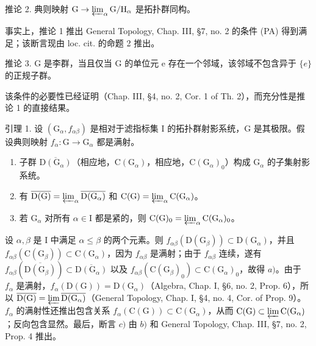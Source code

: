 推论 2. 典则映射 \(\mathrm{G} \to \varprojlim_{\alpha} \mathrm{G} / \mathrm{H}_{\alpha}\) 是拓扑群同构。

事实上，推论 1 推出 General Topology, Chap. III, §7, no. 2 的条件 (PA) 得到满足；该断言现由 loc. cit. 的命题 2 推出。

推论 3. G 是李群，当且仅当 G 的单位元 e 存在一个邻域，该邻域不包含异于 \(\{e\}\) 的正规子群。

该条件的必要性已经证明（Chap. III, §4, no. 2, Cor. 1 of Th. 2），而充分性是推论 1 的直接结果。


引理 1. 设 \((\mathrm{G}_{\alpha}, f_{\alpha \beta})\) 是相对于滤指标集 I 的拓扑群射影系统，G 是其极限。假设典则映射 \(f_{\alpha}: \mathrm{G} \to \mathrm{G}_{\alpha}\) 都是满射。

\begin{enumerate}
\def\labelenumi{\alph{enumi})}
\item
  子群 \(\overline{\mathrm{D}(\mathrm{G}_{\alpha})}\)（相应地，\(\mathrm{C}(\mathrm{G}_{\alpha})\)，相应地，\(\mathrm{C}(\mathrm{G}_{\alpha})_0\)）构成 \(\mathrm{G}_{\alpha}\) 的子集射影系统。
\item
  有 \(\overline{\mathrm{D}(\mathrm{G})}=\varprojlim_{\alpha}\overline{\mathrm{D}(\mathrm{G}_{\alpha})}\) 和 \(\mathrm{C}(\mathrm{G})=\varprojlim_{\alpha}\mathrm{C}(\mathrm{G}_{\alpha})\)。
\item
  若 \(\mathrm{G}_{\alpha}\) 对所有 \(\alpha \in \mathrm{I}\) 都是紧的，则 \(\mathrm{C}(\mathrm{G})_0 = \varprojlim_{\alpha} \mathrm{C}(\mathrm{G}_{\alpha})_0\)。
\end{enumerate}

设 \(\alpha, \beta\) 是 I 中满足 \(\alpha \leq \beta\) 的两个元素。则 \(f_{\alpha \beta}(\mathrm{D}(\mathrm{G}_{\beta})) \subset \mathrm{D}(\mathrm{G}_{\alpha})\)，并且 \(f_{\alpha \beta}(\mathrm{C}(\mathrm{G}_{\beta})) \subset \mathrm{C}(\mathrm{G}_{\alpha})\)，因为 \(f_{\alpha \beta}\) 是满射；由于 \(f_{\alpha \beta}\) 连续，遂有 \(f_{\alpha \beta}(\overline{\mathrm{D}(\mathrm{G}_{\beta})}) \subset \overline{\mathrm{D}(\mathrm{G}_{\alpha})}\) 以及 \(f_{\alpha \beta}(\mathrm{C}(\mathrm{G}_{\beta})_0) \subset \mathrm{C}(\mathrm{G}_{\alpha})_0\)，故得 \(a)\)。由于 \(f_{\alpha}\) 是满射，\(f_{\alpha}(\mathrm{D}(\mathrm{G})) = \mathrm{D}(\mathrm{G}_{\alpha})\)（Algebra, Chap. I, §6, no. 2, Prop. 6），所以 \(\overline{\mathrm{D}(\mathrm{G})} = \varprojlim \overline{\mathrm{D}(\mathrm{G}_{\alpha})}\)（General Topology, Chap. I, §4, no. 4, Cor. of Prop. 9）。\(f_{\alpha}\) 的满射性还推出包含关系 \(f_{\alpha}(\mathrm{C}(\mathrm{G})) \subset \mathrm{C}(\mathrm{G}_{\alpha})\)，从而 \(\mathrm{C}(\mathrm{G}) \subset \varprojlim \mathrm{C}(\mathrm{G}_{\alpha})\)；反向包含显然。最后，断言 \(c)\) 由 \(b)\) 和 General Topology, Chap. III, §7, no. 2, Prop. 4 推出。

